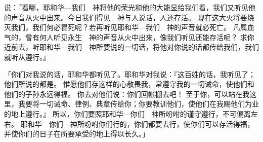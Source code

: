 {说：『看哪，耶和华—我们　神将他的荣光和他的大能显给我们看，我们又听见他的声音从火中出来。今日我们得见　神与人说话，人还存活。
现在这大火将要烧灭我们，我们何必冒死呢？若再听见耶和华—我们　神的声音就必死亡。
凡属血气的，曾有何人听见永生　神的声音从火中出来，像我们听见还能存活呢？
求你近前去，听耶和华—我们　神所要说的一切话，将他对你说的话都传给我们，我们就听从遵行。』
\par }{\PP {}「你们对我说的话，耶和华都听见了。耶和华对我说：『这百姓的话，我听见了；他们所说的都是。
惟愿他们存这样的心敬畏我，常遵守我的一切诫命，使他们和他们的子孙永远得福。
你去对他们说：你们回帐棚去吧！
至于你，可以站在我这里，我要将一切诫命、律例、典章传给你；你要教训他们，使他们在我赐他们为业的地上遵行。』
所以，你们要照耶和华—你们　神所吩咐的谨守遵行，不可偏离左右。
耶和华—你们　神所吩咐你们行的，你们都要去行，使你们可以存活得福，并使你们的日子在所要承受的地上得以长久。」

}
